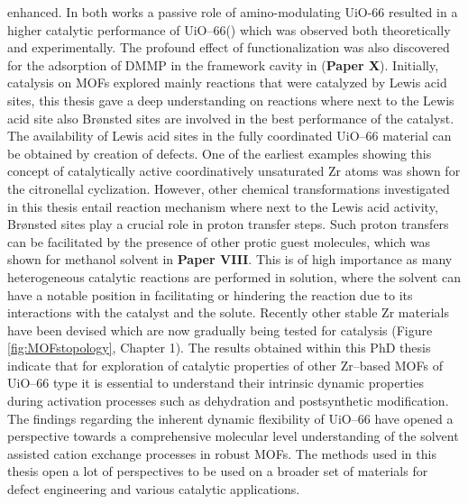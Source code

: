 enhanced. In both works a passive role of amino-modulating UiO-66 resulted in a
higher catalytic performance of UiO--66() which was observed both
theoretically and experimentally. The profound effect of functionalization was also discovered for the adsorption of DMMP in the framework cavity in (\textbf{Paper X}).
\npar
Initially, catalysis on MOFs explored mainly reactions that were catalyzed
by Lewis acid sites, this thesis gave a deep understanding on reactions where
next to the Lewis acid site also Br\o{}nsted sites are involved in the best
performance of the catalyst.
The availability of Lewis acid sites in the fully coordinated UiO--66 material
can be obtained by creation of defects. One of the earliest examples showing
this concept of catalytically active coordinatively unsaturated Zr atoms was
shown for the citronellal cyclization.
However, other chemical transformations investigated in this thesis entail
reaction mechanism where next to the Lewis acid activity, Br\o{}nsted sites
play a crucial role in proton transfer steps. Such proton transfers
can be facilitated by the presence of other protic guest molecules, which was
shown for methanol solvent in \textbf{Paper VIII}. This is of high importance as
many heterogeneous catalytic reactions are performed in solution, where the
solvent can have a notable position in facilitating or hindering the reaction
due to its interactions with the catalyst and the solute. 
\npar
Recently other stable Zr materials have been devised which are now
gradually being tested for catalysis (Figure
\ref{fig:MOFstopology}, Chapter 1). The results obtained within this PhD
thesis indicate that for exploration of catalytic properties of other Zr--based MOFs of UiO--66 type it is essential to understand their
intrinsic dynamic properties during activation processes such as dehydration and postsynthetic modification.
The findings regarding the inherent dynamic flexibility of UiO--66 have opened a
perspective towards a comprehensive molecular level understanding of the solvent
assisted cation exchange processes in robust MOFs. The methods used in this
thesis open a lot of perspectives to be used on a broader set of materials for
defect engineering and various catalytic applications.

